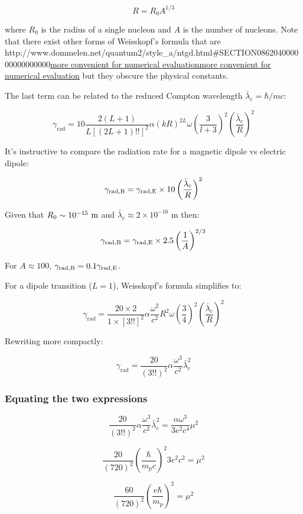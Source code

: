 \documentclass[
]{article}
\let\oldhref\href
\renewcommand{\href}[2]{\ifx#1\urlprefix\oldhref{#1}{#2}\else\uline{\oldhref{#1}{#2}}\fi}
\renewcommand{\[}{\begin{equation}}
\renewcommand{\]}{\end{equation}}
\begin{document}
\[
R = R_0 A^{1/3}
\]

where \(R_0\) is the radius of a single nucleon and \(A\) is the number
of nucleons. Note that there exist other forms of Weisskopf's formula
that are
\href{http://www.dommelen.net/quantum2/style_a/ntgd.html\#SECTION086204000000000000000}{more
convenient for numerical evaluation} but they obscure the physical
constants.

The last term can be related to the reduced Compton wavelength
\(\bar\lambda_c = \hbar / m c\):

\[
\gamma_{\text{rad}}  =  10\frac{2(L+1)}{L [(2L+1)!!]^2} \alpha (kR)^{2L} \omega \left( \frac{3}{l+3} \right)^2 \left( \frac{\bar\lambda_c}{R} \right)^2
\]

It's instructive to compare the radiation rate for a magnetic dipole vs
electric dipole:

\[
\gamma_{\rm rad, B} = \gamma_{\rm rad, E} \times 10\left( \frac{\bar\lambda_c}{R} \right)^2
\]

Given that \(R_0 \sim 10^{-15} \ \rm m\) and
\(\bar\lambda_c \approx 2 \times 10^{-16} \text{ m}\) then:

\[
\gamma_{\rm rad, B} = \gamma_{\rm rad, E} \times 2.5\left( \frac{1}{A} \right)^{2/3}
\]

For \(A\approx100\), \(\gamma_{\rm rad, B} = 0.1\gamma_{\rm rad, E}\).

For a dipole transition (\(L=1\)), Weisskopf's formula simplifies to:

\[
\gamma_{\text{rad}} = \frac{20 \times 2}{1 \times [3!!]^2} \alpha \frac{\omega^2}{c^2} R^2 \omega \left(\frac{3}{4} \right)^2 \left( \frac{\bar\lambda_c}{R} \right)^2
\]

Rewriting more compactly:

\[
\gamma_{\text{rad}} = \frac{20}{(3!!)^2} \alpha \frac{\omega^3}{c^2} \bar\lambda_c^2
\]

\subsubsection{Equating the two
expressions}\label{equating-the-two-expressions-1}

\[
\frac{20}{(3!!)^2} \alpha \frac{\omega^3}{c^2} \bar\lambda_c^2 = \frac{\alpha \omega^3}{3 e^2 c^4} \mu^2
\]

\[
\frac{20}{(720)^2} \left( \frac{\hbar}{m_p c} \right)^2 3e^2c^2 = \mu^2
\]

\[
\frac{60}{(720)^2} \left( \frac{e\hbar}{m_p} \right)^2= \mu^2
\]
\end{document}
